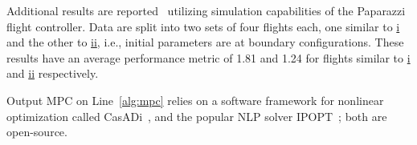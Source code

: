 \documentclass[letterpaper,10pt,journal,twoside]{IEEEtran}
\newcommand{\stt}[1]{{\small\tt #1}} %
\newcommand{\powprof}{\stt{powprofiler}}
\theoremstyle{definition}
\begin{document}
{\color{blue}
Additional results are reported~\cite{seewaldphdthesis} utilizing simulation capabilities of the Paparazzi flight controller. Data are split into two sets of four flights each, one similar to \hyperref[fig:trajs-dyn-i]{i} and the other to \hyperref[fig:trajs-dyn-ii]{ii}, i.e., initial parameters are at boundary configurations.
These results have an average performance metric of 1.81 and 1.24 for flights similar to \hyperref[fig:trajs-dyn-i]{i} and \hyperref[fig:trajs-dyn-i]{ii} respectively.}

Output MPC on Line~\ref{alg:mpc} relies on a software framework for nonlinear optimization called CasADi~\cite{andersson2012casadi%
}, and the popular NLP solver IPOPT~\cite{wachter2006implementation}; both are open-source.



\end{document}
